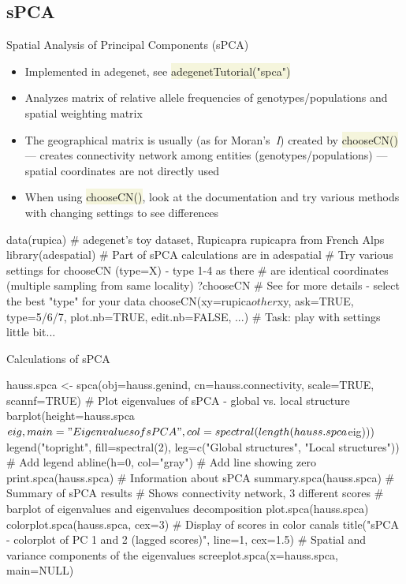 \documentclass[compress, xelatex, 11pt, xcolor=svgnames, aspectratio=169, url={hyphens, lowtilde}]{beamer}
\renewcommand{\texttt}[1]{\colorbox{Beige}{{\ttfamily #1}}}
\begin{document}
\subsection{sPCA}

\begin{frame}[fragile]{Spatial Analysis of Principal Components (sPCA)}
	\begin{itemize}
		\item Implemented in adegenet, see \texttt{adegenetTutorial("spca")}
		\item Analyzes matrix of relative allele frequencies of genotypes/populations and spatial weighting matrix
		\item The geographical matrix is usually (as for Moran's~\textit{I}) created by \texttt{chooseCN()} --- creates connectivity network among entities (genotypes/populations) --- spatial coordinates are not directly used
		\item When using \texttt{chooseCN()}, look at the documentation and try various methods with changing settings to see differences
	\end{itemize}
	\begin{spluscode}
    data(rupica) # adegenet's toy dataset, Rupicapra rupicapra from French Alps
    library(adespatial) # Part of sPCA calculations are in adespatial
    # Try various settings for chooseCN (type=X) - type 1-4 as there
    # are identical coordinates (multiple sampling from same locality)
    ?chooseCN # See for more details - select the best "type" for your data
    chooseCN(xy=rupica$other$xy, ask=TRUE, type=5/6/7, plot.nb=TRUE,
      edit.nb=FALSE, ...) # Task: play with settings little bit...
	\end{spluscode}
\end{frame}

\begin{frame}[fragile]{Calculations of sPCA}
	\begin{spluscode}
    hauss.spca <- spca(obj=hauss.genind, cn=hauss.connectivity,
      scale=TRUE, scannf=TRUE)
    # Plot eigenvalues of sPCA - global vs. local structure
    barplot(height=hauss.spca$eig, main="Eigenvalues of sPCA",
      col=spectral(length(hauss.spca$eig)))
    legend("topright", fill=spectral(2), leg=c("Global structures",
      "Local structures")) # Add legend
    abline(h=0, col="gray") # Add line showing zero
    print.spca(hauss.spca) # Information about sPCA
    summary.spca(hauss.spca) # Summary of sPCA results
    # Shows connectivity network, 3 different scores
    # barplot of eigenvalues and eigenvalues decomposition
    plot.spca(hauss.spca)
    colorplot.spca(hauss.spca, cex=3) # Display of scores in color canals
    title("sPCA - colorplot of PC 1 and 2 (lagged scores)", line=1, cex=1.5)
    # Spatial and variance components of the eigenvalues
    screeplot.spca(x=hauss.spca, main=NULL)
	\end{spluscode}
\end{frame}
\end{document}
